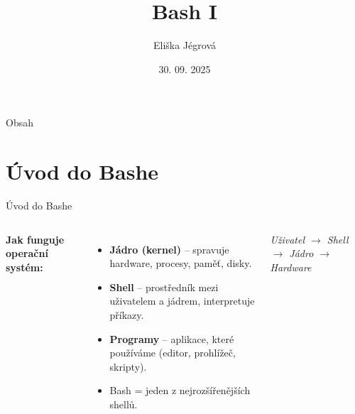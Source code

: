 \documentclass{beamer}
\title{Bash I}
\author{Eliška Jégrová}
\date{30. 09. 2025}
\begin{document}
  \frame{\titlepage}

  \begin{frame}{Obsah}
    \tableofcontents
  \end{frame}

\section{Úvod do Bashe}
\begin{frame}{Úvod do Bashe}
  \begin{columns}[c]
    \textbf{Jak funguje operační systém:}
    \begin{itemize}
      \item \textbf{Jádro (kernel)} – spravuje hardware, procesy, paměť, disky.
      \item \textbf{Shell} – prostředník mezi uživatelem a jádrem, interpretuje příkazy.
      \item \textbf{Programy} – aplikace, které používáme (editor, prohlížeč, skripty).
      \item Bash = jeden z nejrozšířenějších shellů.
    \end{itemize}

    \vspace{0.5em}
    \textit{Uživatel $\rightarrow$ Shell $\rightarrow$ Jádro $\rightarrow$ Hardware}

    \centering
    \vspace{0.5em}
  \end{columns}
\end{frame}
\end{document}
